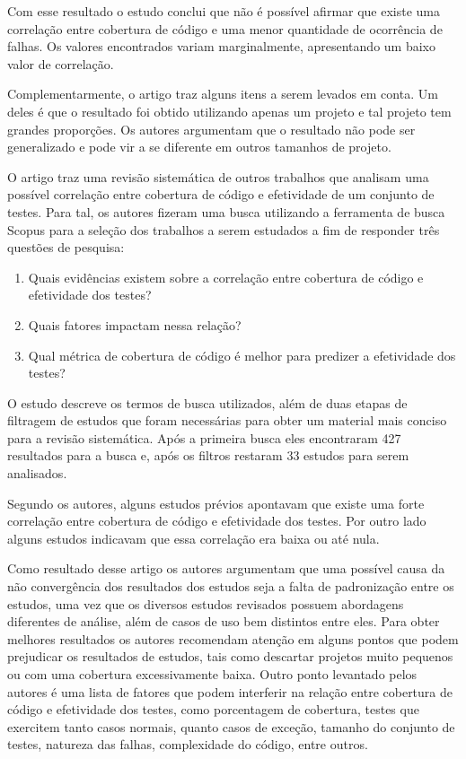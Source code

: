 \documentclass[11.5pt]{article}
\begin{document}
Com esse resultado o estudo conclui que não é possível afirmar que existe uma correlação entre
cobertura de código e uma menor quantidade de ocorrência de falhas. Os valores encontrados variam
marginalmente, apresentando um baixo valor de correlação.

Complementarmente, o artigo traz alguns itens a serem levados em conta.
Um deles é que o resultado foi obtido utilizando apenas um projeto e tal projeto tem grandes
proporções.
Os autores argumentam que o resultado não pode ser generalizado e pode vir a se diferente em outros
tamanhos de projeto.

O artigo \cite{coverageMetaAnalysis} traz uma revisão sistemática de outros trabalhos que analisam
uma possível correlação entre cobertura de código e efetividade de um conjunto de testes.
Para tal, os autores fizeram uma busca utilizando a ferramenta de busca Scopus para a seleção dos
trabalhos a serem estudados a fim de responder três questões de pesquisa:
\begin{enumerate}
    \item Quais evidências existem sobre a correlação entre cobertura de código e efetividade dos
          testes?

    \item Quais fatores impactam nessa relação?

    \item Qual métrica de cobertura de código é melhor para predizer a efetividade dos testes?
\end{enumerate}

O estudo descreve os termos de busca utilizados, além de duas etapas de filtragem de estudos que
foram necessárias para obter um material mais conciso para a revisão sistemática.
Após a primeira busca eles encontraram 427 resultados para a busca e, após os filtros restaram 33
estudos para serem analisados.

Segundo os autores, alguns estudos prévios apontavam que existe uma forte correlação entre cobertura
de código e efetividade dos testes.
Por outro lado alguns estudos indicavam que essa correlação era baixa ou até nula.

Como resultado desse artigo os autores argumentam que uma possível causa da não convergência dos
resultados dos estudos seja a falta de padronização entre os estudos, uma vez que os diversos
estudos revisados possuem abordagens diferentes de análise, além de casos de uso bem distintos entre
eles.
Para obter melhores resultados os autores recomendam atenção em alguns pontos que podem prejudicar
os resultados de estudos, tais como descartar projetos muito pequenos ou com uma cobertura
excessivamente baixa.
Outro ponto levantado pelos autores é uma lista de fatores que podem interferir na relação entre
cobertura de código e efetividade dos testes, como porcentagem de cobertura, testes que exercitem
tanto casos normais, quanto casos de exceção, tamanho do conjunto de testes, natureza das falhas,
complexidade do código, entre outros.
\end{document}
